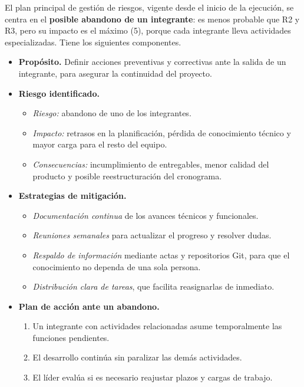 \documentclass[12pt,a4paper]{article}
\begin{document}
El plan principal de gestión de riesgos, vigente desde el inicio de la
ejecución, se centra en el \textbf{posible abandono de un integrante}: es
menos probable que R2 y R3, pero su impacto es el máximo (5), porque cada
integrante lleva actividades especializadas. Tiene los siguientes componentes.

\begin{itemize}
    \item \textbf{Propósito.} Definir acciones preventivas y correctivas
    ante la salida de un integrante, para asegurar la continuidad del
    proyecto.

    \item \textbf{Riesgo identificado.}
    \begin{itemize}
        \item \textit{Riesgo:} abandono de uno de los integrantes.
        \item \textit{Impacto:} retrasos en la planificación, pérdida de
        conocimiento técnico y mayor carga para el resto del equipo.
        \item \textit{Consecuencias:} incumplimiento de entregables, menor
        calidad del producto y posible reestructuración del cronograma.
    \end{itemize}

    \item \textbf{Estrategias de mitigación.}
    \begin{itemize}
        \item \textit{Documentación continua} de los avances técnicos y
        funcionales.
        \item \textit{Reuniones semanales} para actualizar el progreso y
        resolver dudas.
        \item \textit{Respaldo de información} mediante actas y
        repositorios Git, para que el conocimiento no dependa de una sola
        persona.
        \item \textit{Distribución clara de tareas}, que facilita
        reasignarlas de inmediato.
    \end{itemize}

    \item \textbf{Plan de acción ante un abandono.}
    \begin{enumerate}
        \item Un integrante con actividades relacionadas asume
        temporalmente las funciones pendientes.
        \item El desarrollo continúa sin paralizar las demás actividades.
        \item El líder evalúa si es necesario reajustar plazos y cargas de
        trabajo.
    \end{enumerate}


\end{itemize}
\end{document}
